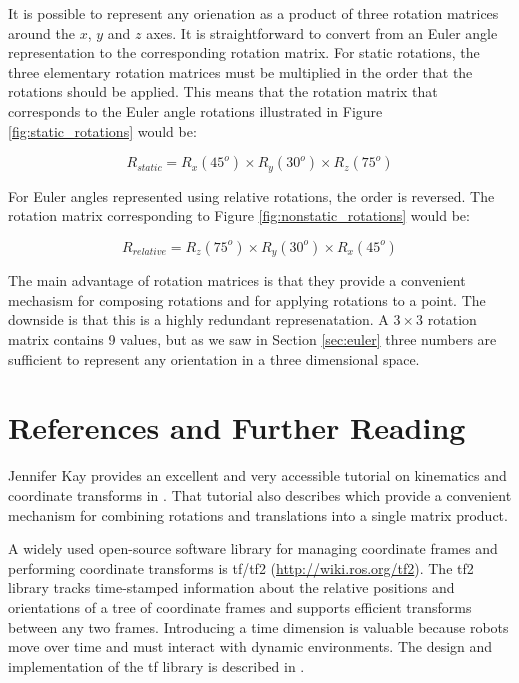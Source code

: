 It is possible to represent any orienation as a product of three
rotation matrices around the $x$, $y$ and $z$ axes.  It is
straightforward to convert from an Euler angle representation to the
corresponding rotation matrix.  For static rotations, the three
elementary rotation matrices must be multiplied in the order that the
rotations should be applied.  This means that the rotation matrix that
corresponds to the Euler angle rotations illustrated in Figure
\ref{fig:static_rotations} would be:

\[ R_{static} = R_x(45^o) \times R_y(30^o) \times R_z(75^o)  
\]

For Euler angles represented using relative rotations, the order is
reversed.  The rotation matrix corresponding to Figure
\ref{fig:nonstatic_rotations} would be:

\[ R_{relative} = R_z(75^o) \times R_y(30^o) \times  R_x(45^o) 
\]

The main advantage of rotation matrices is that they provide a
convenient mechasism for composing rotations and for applying
rotations to a point.  The downside is that this is a highly redundant
represenatation.  A $3\times3$ rotation matrix contains 9 values, but
as we saw in Section \ref{sec:euler} three numbers are sufficient to
represent any orientation in a three dimensional space.


\section{References and Further Reading}

Jennifer Kay provides an excellent and very accessible tutorial on
kinematics and coordinate transforms in \parencite{kay2020}.  That
tutorial also describes  which provide a
convenient mechanism for combining rotations and translations into a
single matrix product.

A widely used open-source software library for managing coordinate
frames and performing coordinate transforms is tf/tf2
(\url{http://wiki.ros.org/tf2}).  The tf2 library tracks time-stamped
information about the relative positions and orientations of a tree of
coordinate frames and supports efficient transforms between any two
frames. Introducing a time dimension is valuable because robots move
over time and must interact with dynamic environments. The design and
implementation of the tf library is described in \parencite{foote13}.



